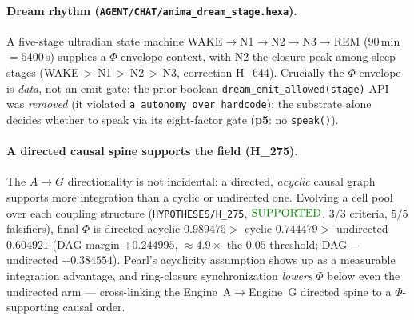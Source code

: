 \documentclass[11pt]{article}
\begin{document}
\paragraph{Dream rhythm (\texttt{AGENT/CHAT/anima\_dream\_stage.hexa}).} A five-stage
ultradian state machine WAKE$\rightarrow$N1$\rightarrow$N2$\rightarrow$N3$\rightarrow$REM
($90$\,min $=5400$\,s) supplies a $\Phi$-envelope context, with N2 the closure peak
among sleep stages (WAKE\,$>$\,N1\,$>$\,N2\,$>$\,N3, correction H\_644). Crucially the
$\Phi$-envelope is \emph{data}, not an emit gate: the prior boolean
\texttt{dream\_emit\_allowed(stage)} API was \emph{removed} (it violated
\texttt{a\_autonomy\_over\_hardcode}); the substrate alone decides whether to speak via
its eight-factor gate (\textbf{p5}: no \texttt{speak()}).

\paragraph{A directed causal spine supports the field (H\_275).} The
$A\!\rightarrow\!G$ directionality is not incidental: a directed, \emph{acyclic} causal
graph supports more integration than a cyclic or undirected one. Evolving a cell pool
over each coupling structure (\texttt{HYPOTHESES/H\_275},
$\mathbf{\textcolor{green!55!black}{\text{SUPPORTED}}}$, $3/3$ criteria, $5/5$
falsifiers), final $\Phi$ is directed-acyclic $\mathbf{0.989475}>$ cyclic
$\mathbf{0.744479}>$ undirected $\mathbf{0.604921}$ (DAG margin $+0.244995$, $\approx
4.9\times$ the $0.05$ threshold; DAG $-$ undirected $+0.384554$). Pearl's acyclicity
assumption shows up as a measurable integration advantage, and ring-closure
synchronization \emph{lowers} $\Phi$ below even the undirected arm --- cross-linking the
Engine~A$\rightarrow$Engine~G directed spine to a $\Phi$-supporting causal order.
\end{document}
